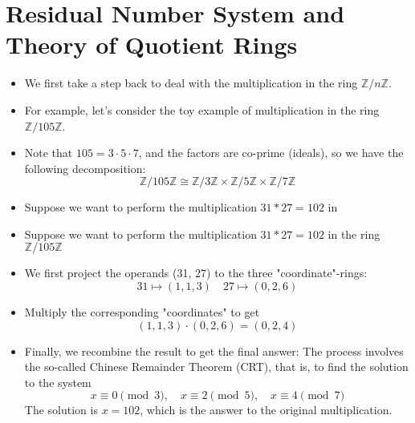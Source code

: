 \section{Residual Number System and Theory of Quotient Rings}

\begin{frame}
    \begin{itemize}
        \item We first take a step back to deal with the multiplication in 
              the ring \(\mathbb{Z}/ n\mathbb{Z}\).
        \item For example, let's consider the toy example of multiplication 
              in the ring \(\mathbb{Z}/ 105\mathbb{Z}\).
        \item Note that \( 105 = 3 \cdot 5\cdot 7\), 
              and the factors are co-prime (ideals), 
              so we have the following decomposition:
              \[ \mathbb{Z}/ 105\mathbb{Z} \cong 
                 \mathbb{Z}/ 3\mathbb{Z} \times 
                 \mathbb{Z}/ 5\mathbb{Z} \times 
                 \mathbb{Z}/ 7\mathbb{Z} \]
        \item Suppose we want to perform the multiplication \(31 * 27 = 102\) in 
        \item Suppose we want to perform the multiplication \(31 * 27 = 102\) in 
              the ring \(\mathbb{Z}/ 105\mathbb{Z}\)
        \item We first project the operands (31, 27) to the three "coordinate"-rings:
              \[ 31 \mapsto (1, 1, 3) \quad 27 \mapsto (0, 2, 6) \]
        \item Multiply the corresponding "coordinates" to get
              \[ (1, 1, 3) \cdot (0, 2, 6) = (0, 2, 4) \]
        \item Finally, we recombine the result to get the final answer:
              The process involves the so-called Chinese Remainder Theorem (CRT),
              that is, to find the solution to the system
              \[
                x \equiv 0 \pmod{3}, \quad
                x \equiv 2 \pmod{5}, \quad
                x \equiv 4 \pmod{7}
              \]
              The solution is \(x = 102\), 
              which is the answer to the original multiplication.
             

    \end{itemize}
\end{frame}


